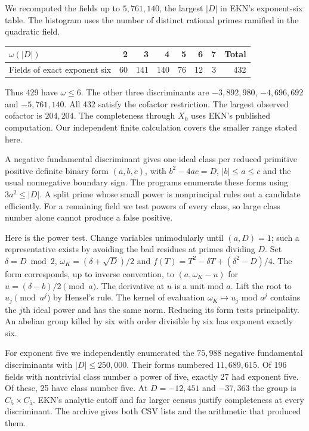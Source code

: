 \documentclass[11pt]{article}
\newcommand{\heading}[1]{\par\noindent{\large\bfseries\color{ink}#1}\par\smallskip}
\begin{document}
We recomputed the fields up to $5{,}761{,}140$, the largest $|D|$ in EKN's exponent-six table. The histogram uses the number of distinct rational primes ramified in the quadratic field.
\begin{center}
\begin{tabular}{lrrrrrrr}\toprule
$\omega(|D|)$ & 2&3&4&5&6&7&Total\\\midrule
Fields of exact exponent six&60&141&140&76&12&3&432\\\bottomrule
\end{tabular}\end{center}
Thus 429 have $\omega\le6$. The other three discriminants are $-3{,}892{,}980$, $-4{,}696{,}692$ and $-5{,}761{,}140$. All 432 satisfy the cofactor restriction. The largest observed cofactor is $204{,}204$. The completeness through $X_0$ uses EKN's published computation. Our independent finite calculation covers the smaller range stated here.

\heading{Checking class groups by binary quadratic forms}
A negative fundamental discriminant gives one ideal class per reduced primitive positive definite binary form $(a,b,c)$, with $b^2-4ac=D$, $|b|\le a\le c$ and the usual nonnegative boundary sign. The programs enumerate these forms using $3a^2\le |D|$. A split prime whose small power is nonprincipal rules out a candidate efficiently. For a remaining field we test powers of every class, so large class number alone cannot produce a false positive.

Here is the power test. Change variables unimodularly until $(a,D)=1$; such a representative exists by avoiding the bad residues at primes dividing $D$. Set $\delta=D\bmod 2$, $\omega_K=(\delta+\sqrt D)/2$ and $f(T)=T^2-\delta T+(\delta^2-D)/4$. The form corresponds, up to inverse convention, to $(a,\omega_K-u)$ for $u=(\delta-b)/2\pmod a$. The derivative at $u$ is a unit mod $a$. Lift the root to $u_j\pmod {a^j}$ by Hensel's rule. The kernel of evaluation $\omega_K\mapsto u_j$ mod $a^j$ contains the $j$th ideal power and has the same norm. Reducing its form tests principality. An abelian group killed by six with order divisible by six has exponent exactly six.

For exponent five we independently enumerated the $75{,}988$ negative fundamental discriminants with $|D|\le250{,}000$. Their forms numbered $11{,}689{,}615$. Of 196 fields with nontrivial class number a power of five, exactly 27 had exponent five. Of these, 25 have class number five. At $D=-12{,}451$ and $-37{,}363$ the group is $C_5\times C_5$. EKN's analytic cutoff and far larger census justify completeness at every discriminant. The archive gives both CSV lists and the arithmetic that produced them.
\end{document}
